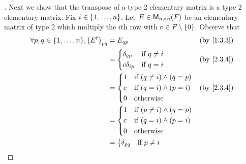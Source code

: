 \begin{proof}[]
	Next we show that the transpose of a type 2 elementary matrix is a type 2 elementary matrix.
	Fix \(i \in \left\lbrace1, \dots, n\right\rbrace\).
	Let \(E \in \mathsf{M}_{{n} \times n}({\mathit{F}})\) be an elementary matrix of type 2 which multiply the \(i\)th row with \(c \in \mathit{F} \setminus \left\lbrace0\right\rbrace\).
	Observe that
	\begin{align*}
		\forall p, q \in \set{1, \dots, n}, \pa{\tp{E}}_{p q} & = E_{q p}                                  &  & \by{1.3.3} \\
		                                                      & = \begin{dcases}
			                                                          \delta_{q p}   & \text{if } q \neq i \\
			                                                          c \delta_{i p} & \text{if } q = i
		                                                          \end{dcases}    &  & \by{2.3.4}                     \\
		                                                      & = \begin{dcases}
			                                                          1 & \text{if } (q \neq i) \land (q = p) \\
			                                                          c & \text{if } (q = i) \land (p = i)    \\
			                                                          0 & \text{otherwise}
		                                                          \end{dcases} &  & \by{2.3.4}                  \\
		                                                      & = \begin{dcases}
			                                                          1 & \text{if } (p \neq i) \land (q = p) \\
			                                                          c & \text{if } (q = i) \land (p = i)    \\
			                                                          0 & \text{otherwise}
		                                                          \end{dcases}                  \\
		                                                      & = \begin{dcases}
			                                                          \delta_{p q}   & \text{if } p \neq i \\

\end{dcases}
\end{align*}
\end{proof}
